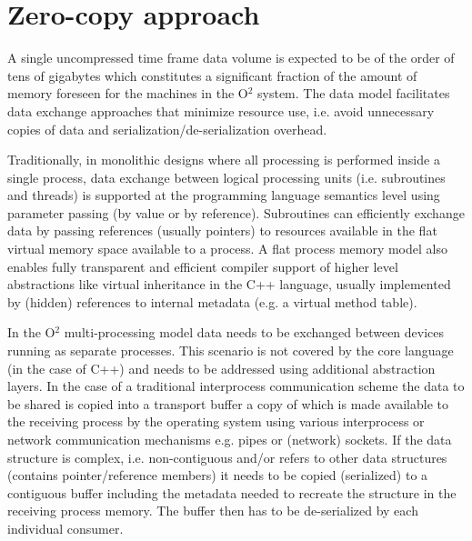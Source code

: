\documentclass[a4paper,twoside]{article}
\def\O2{O$^2$}
\begin{document}
%

\section{Zero-copy approach}

A single uncompressed time frame data volume is expected to be of the order of tens of gigabytes which constitutes a significant fraction of the amount of memory foreseen for the machines in the \O2 system. The data model facilitates data exchange approaches that minimize resource use, i.e. avoid unnecessary copies of data and serialization/de-serialization overhead.

Traditionally, in monolithic designs where all processing is performed inside a single process, data exchange between logical processing units (i.e. subroutines and threads) is supported at the programming language semantics level using parameter passing (by value or by reference).
Subroutines can efficiently exchange data by passing references (usually pointers) to resources available in the flat virtual memory space available to a process.
A flat process memory model also enables fully transparent and efficient compiler support of higher level abstractions like virtual inheritance in the C++ language, usually implemented by (hidden) references to internal metadata (e.g. a virtual method table).

In the \O2 multi-processing model data needs to be exchanged between devices running as separate processes. This scenario is not covered by the core language (in the case of C++) and needs to be addressed using additional abstraction layers. In the case of a traditional interprocess communication scheme the data to be shared is copied into a transport buffer a copy of which is made available to the receiving process by the operating system using various interprocess or network communication mechanisms e.g. pipes or (network) sockets. 
If the data structure is complex, i.e. non-contiguous and/or refers to other data structures (contains pointer/reference members) it needs to be copied (serialized) to a contiguous buffer including the metadata needed to recreate the structure in the receiving process memory.
The buffer then has to be de-serialized by each individual consumer.
\end{document}
